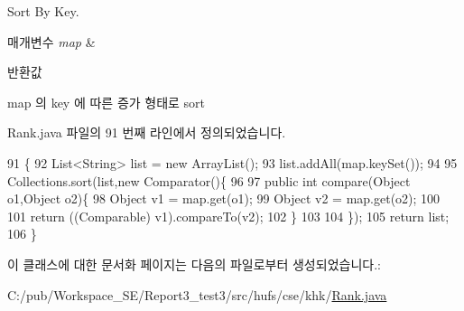 Sort By Key. 


\begin{DoxyParams}{매개변수}
{\em map} & \\
\hline
\end{DoxyParams}
\begin{DoxyReturn}{반환값}

\end{DoxyReturn}
map 의 key 에 따른 증가 형태로 sort 

Rank.\+java 파일의 91 번째 라인에서 정의되었습니다.


\begin{DoxyCode}
91                                                \{
92             List<String> list = \textcolor{keyword}{new} ArrayList();
93             list.addAll(map.keySet());
94              
95             Collections.sort(list,\textcolor{keyword}{new} Comparator()\{
96                  
97                 \textcolor{keyword}{public} \textcolor{keywordtype}{int} compare(Object o1,Object o2)\{
98                     Object v1 = map.get(o1);
99                     Object v2 = map.get(o2);
100                      
101                     \textcolor{keywordflow}{return} ((Comparable) v1).compareTo(v2);
102                 \}
103                  
104             \});
105             \textcolor{keywordflow}{return} list;
106     \}       
\end{DoxyCode}


이 클래스에 대한 문서화 페이지는 다음의 파일로부터 생성되었습니다.\+:\begin{DoxyCompactItemize}
\item 
C\+:/pub/\+Workspace\+\_\+\+S\+E/\+Report3\+\_\+test3/src/hufs/cse/khk/\hyperlink{_rank_8java}{Rank.\+java}\end{DoxyCompactItemize}
